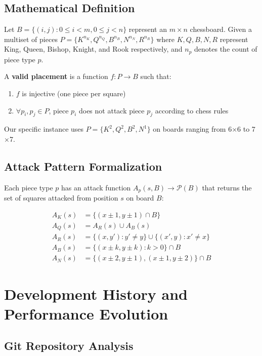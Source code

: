 \documentclass[12pt,a4paper]{article}
\theoremstyle{definition}
\begin{document}
\subsection{Mathematical Definition}

Let $B = \{(i,j) : 0 \leq i < m, 0 \leq j < n\}$ represent an $m \times n$ chessboard. Given a multiset of pieces $P = \{K^{n_K}, Q^{n_Q}, B^{n_B}, N^{n_N}, R^{n_R}\}$ where $K, Q, B, N, R$ represent King, Queen, Bishop, Knight, and Rook respectively, and $n_p$ denotes the count of piece type $p$.

A \textbf{valid placement} is a function $f: P \rightarrow B$ such that:
\begin{enumerate}
\item $f$ is injective (one piece per square)
\item $\forall p_i, p_j \in P$, piece $p_i$ does not attack piece $p_j$ according to chess rules
\end{enumerate}

Our specific instance uses $P = \{K^2, Q^2, B^2, N^1\}$ on boards ranging from 6$\times$6 to 7$\times$7.

\subsection{Attack Pattern Formalization}

Each piece type $p$ has an attack function $A_p(s, B) \rightarrow \mathcal{P}(B)$ that returns the set of squares attacked from position $s$ on board $B$:

\begin{align}
A_K(s) &= \{(x \pm 1, y \pm 1) \cap B\} \\
A_Q(s) &= A_R(s) \cup A_B(s) \\
A_R(s) &= \{(x, y') : y' \neq y\} \cup \{(x', y) : x' \neq x\} \\
A_B(s) &= \{(x \pm k, y \pm k) : k > 0\} \cap B \\
A_N(s) &= \{(x \pm 2, y \pm 1), (x \pm 1, y \pm 2)\} \cap B
\end{align}

\section{Development History and Performance Evolution}

\subsection{Git Repository Analysis}
\end{document}

